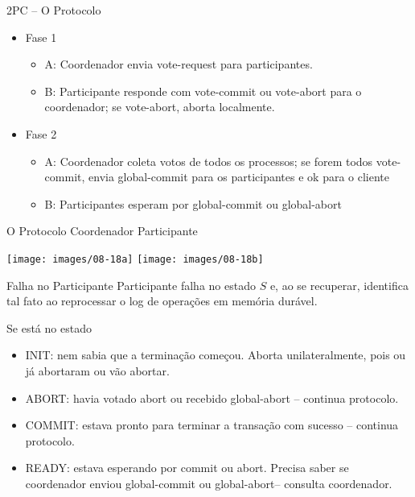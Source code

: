 \begin{frame}{2PC -- O Protocolo}
\begin{itemize}
	\item Fase 1
	\begin{itemize}
		\item A: Coordenador envia vote-request para participantes.
		\item B: Participante responde com vote-commit ou vote-abort para o coordenador; se vote-abort, aborta localmente.
	\end{itemize}
	\item Fase 2
	\begin{itemize}
		\item A: Coordenador coleta votos de todos os processos; se forem todos vote-commit, envia global-commit para os participantes e ok para o cliente
		\item B: Participantes esperam por global-commit ou global-abort
	\end{itemize}
\end{itemize}
\end{frame}


\begin{frame}{O Protocolo}
Coordenador \hfill Participante

\hfill
\texttt{[image: images/08-18a]}
\hfill
\texttt{[image: images/08-18b]}
\end{frame}

\begin{frame}{Falha no Participante}
Participante falha no estado $S$ e, ao se recuperar, identifica tal fato ao reprocessar o log de operações em memória durável.

Se está no estado
\begin{itemize}
	\item INIT: \pause nem sabia que a terminação começou. \pause Aborta unilateralmente, pois ou já abortaram ou vão abortar.\pause
	\item ABORT: havia votado abort ou recebido global-abort -- continua protocolo.
	\item COMMIT: estava pronto para terminar a transação com sucesso -- continua protocolo. 
	\item READY: \pause estava esperando por commit ou abort. \pause Precisa saber se coordenador enviou global-commit ou global-abort\pause -- consulta coordenador.
\end{itemize}
\end{frame}

